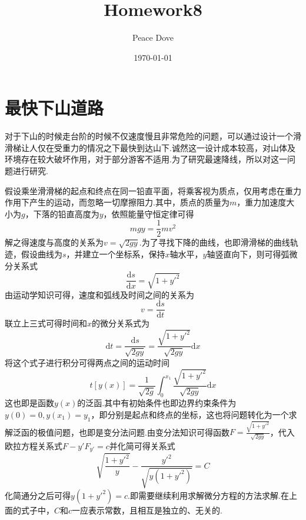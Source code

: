 \documentclass{article}
\title{\heiti Homework8}
\author{\kaishu Peace Dove}
\date{\kaishu\today}
\begin{document}
	\maketitle
	\section{最快下山道路}
	对于下山的时候走台阶的时候不仅速度慢且非常危险的问题，可以通过设计一个滑滑梯让人仅在受重力的情况之下最快到达山下.诚然这一设计成本较高，对山体及环境存在较大破坏作用，对于部分游客不适用.为了研究最速降线，所以对这一问题进行研究.
	
	假设乘坐滑滑梯的起点和终点在同一铅直平面，将乘客视为质点，仅用考虑在重力作用下产生的运动，而忽略一切摩擦阻力.其中，质点的质量为$m$，重力加速度大小为$g$，下落的铅直高度为$y$，依照能量守恒定律可得
	\begin{equation}
		mgy=\frac{1}{2}mv^2
	\end{equation}
	解之得速度与高度的关系为$v=\sqrt{2gy}$.为了寻找下降的曲线，也即滑滑梯的曲线轨迹，假设曲线为$s$，并建立一个坐标系，保持$x$轴水平，$y$轴竖直向下，则可得弧微分关系式
	\begin{equation}
		\frac{\mathrm{d}s}{\mathrm{d}x}=\sqrt{1+y'^2}
	\end{equation}
	由运动学知识可得，速度和弧线及时间之间的关系为
	\begin{equation}
		v=\frac{\mathrm{d}s}{\mathrm{d}t}
	\end{equation}
	联立上三式可得时间和$x$的微分关系式为
	\begin{equation}
	\mathrm{d}t=\frac{\mathrm{d}s}{\sqrt{2gy}}=\frac{\sqrt{1+y'^2}}{\sqrt{2gy}}\mathrm{d}x
	\end{equation}
	将这个式子进行积分可得两点之间的运动时间
	\begin{equation}
	t[y(x)]=\frac{1}{\sqrt{2g}}\int_{0}^{x_1}\frac{\sqrt{1+y'^2}}{\sqrt{2gy}}\mathrm{d}x
	\end{equation}
	这也即是函数$y(x)$的泛函.其中有初始条件也即边界约束条件为$y(0)=0,y(x_1)=y_1$，即分别是起点和终点的坐标，这也将问题转化为一个求解泛函的极值问题，也即是变分法问题.由变分法知识可得函数$F=\frac{\sqrt{1+y'^2}}{\sqrt{2gy}}$，代入欧拉方程关系式$F-y'F_{y'}=c$并化简可得关系式
	\begin{equation}
	\sqrt{\frac{1+y'^2}{y}}-\frac{y'^2}{\sqrt{y(1+y'^2)}}=C
	\end{equation}
	化简通分之后可得$y(1+y'^2)=c$.即需要继续利用求解微分方程的方法求解.在上面的式子中，$C$和$c$一应表示常数，且相互是独立的、无关的.
	
\end{document}
